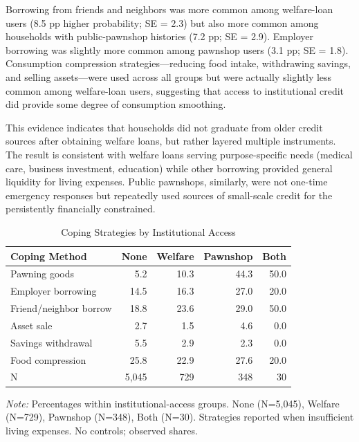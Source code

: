 \documentclass[12pt,a4paper]{article}
\begin{document}
Borrowing from friends and neighbors was more common among welfare-loan users (8.5 pp higher probability; SE = 2.3) but also more common among households with public-pawnshop histories (7.2 pp; SE = 2.9). Employer borrowing was slightly more common among pawnshop users (3.1 pp; SE = 1.8). Consumption compression strategies—reducing food intake, withdrawing savings, and selling assets—were used across all groups but were actually slightly less common among welfare-loan users, suggesting that access to institutional credit did provide some degree of consumption smoothing.

This evidence indicates that households did not graduate from older credit sources after obtaining welfare loans, but rather layered multiple instruments. The result is consistent with welfare loans serving purpose-specific needs (medical care, business investment, education) while other borrowing provided general liquidity for living expenses. Public pawnshops, similarly, were not one-time emergency responses but repeatedly used sources of small-scale credit for the persistently financially constrained.

\begin{table}[!h]
\centering
\small
\caption{Coping Strategies by Institutional Access}
\label{tab:coping}
\begin{tabular}{lrrrr}
\toprule
Coping Method & None & Welfare & Pawnshop & Both \\
\midrule
Pawning goods & 5.2 & 10.3 & 44.3 & 50.0 \\
Employer borrowing & 14.5 & 16.3 & 27.0 & 20.0 \\
Friend/neighbor borrow & 18.8 & 23.6 & 29.0 & 50.0 \\
Asset sale & 2.7 & 1.5 & 4.6 & 0.0 \\
Savings withdrawal & 5.5 & 2.9 & 2.3 & 0.0 \\
Food compression & 25.8 & 22.9 & 27.6 & 20.0 \\
\midrule
N & 5,045 & 729 & 348 & 30 \\
\bottomrule
\end{tabular}

\noindent\small\emph{Note:} Percentages within institutional-access groups. None (N=5,045), Welfare (N=729), Pawnshop (N=348), Both (N=30). Strategies reported when insufficient living expenses. No controls; observed shares.
\end{table}
\end{document}
